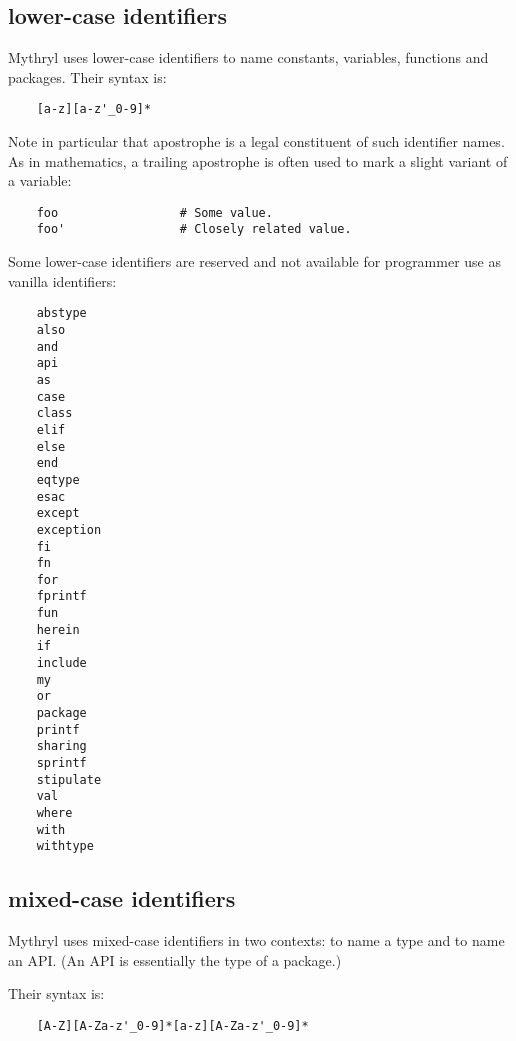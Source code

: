 \cutend*


\subsection{lower-case identifiers}
\label{section:ref:identifiers:lower-case}

Mythryl uses lower-case identifiers to name constants,
variables, functions and packages.  Their syntax is:

\begin{verbatim}
    [a-z][a-z'_0-9]*
\end{verbatim}

Note in particular that apostrophe is a legal constituent 
of such identifier names.  As in mathematics, a trailing 
apostrophe is often used to mark a slight variant of a 
variable:

\begin{verbatim}
    foo                 # Some value.
    foo'                # Closely related value.
\end{verbatim}

Some lower-case identifiers are reserved and not 
available for programmer use as vanilla identifiers:

\begin{verbatim}
    abstype
    also
    and
    api
    as
    case
    class
    elif
    else
    end
    eqtype
    esac
    except
    exception
    fi
    fn
    for
    fprintf
    fun
    herein
    if
    include
    my
    or
    package
    printf
    sharing
    sprintf
    stipulate
    val
    where
    with
    withtype
\end{verbatim}


\cutend*

\subsection{mixed-case identifiers}
\label{section:ref:identifiers:mixed-case}

Mythryl uses mixed-case identifiers in two 
contexts: to name a type and to name an API. 
(An API is essentially the type of a package.)

Their syntax is:

\begin{verbatim}
    [A-Z][A-Za-z'_0-9]*[a-z][A-Za-z'_0-9]*
\end{verbatim}


